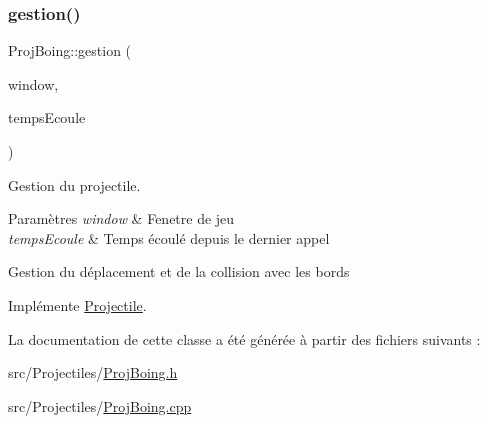 \subsubsection{\texorpdfstring{gestion()}{gestion()}}
{\footnotesize\ttfamily Proj\+Boing\+::gestion (\begin{DoxyParamCaption}\item[{sf\+::\+Render\+Window \&}]{window,  }\item[{sf\+::\+Time}]{temps\+Ecoule }\end{DoxyParamCaption})\hspace{0.3cm}{\ttfamily [virtual]}}



Gestion du projectile. 


\begin{DoxyParams}{Paramètres}
{\em window} & Fenetre de jeu \\
\hline
{\em temps\+Ecoule} & Temps écoulé depuis le dernier appel\\
\hline
\end{DoxyParams}
Gestion du déplacement et de la collision avec les bords 

Implémente \hyperlink{class_projectile_a09e02b793473660fc59a329a4dfea0ec}{Projectile}.



La documentation de cette classe a été générée à partir des fichiers suivants \+:\begin{DoxyCompactItemize}
\item 
src/\+Projectiles/\hyperlink{_proj_boing_8h}{Proj\+Boing.\+h}\item 
src/\+Projectiles/\hyperlink{_proj_boing_8cpp}{Proj\+Boing.\+cpp}\end{DoxyCompactItemize}
